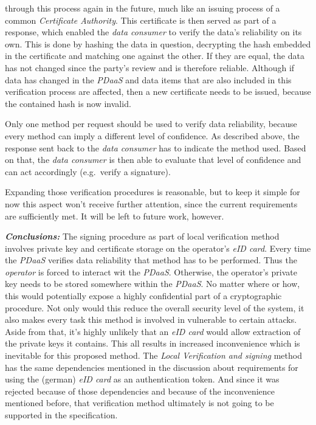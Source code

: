 \documentclass[12pt,english,a4paper,titlepage,cleardoublepage=empty,dottedtoc]{report}
\begin{document}
\begin{enumerate}
  through this process again in the future, much like an issuing process
  of a common \emph{Certificate Authority}. This certificate is then
  served as part of a response, which enabled the \emph{data consumer}
  to verify the data's reliability on its own. This is done by hashing
  the data in question, decrypting the hash embedded in the certificate
  and matching one against the other. If they are equal, the data has
  not changed since the party's review and is therefore reliable.
  Although if data has changed in the \emph{PDaaS} and data items that
  are also included in this verification process are affected, then a
  new certificate needs to be issued, because the contained hash is now
  invalid.
\end{enumerate}

Only one method per request should be used to verify data reliability,
because every method can imply a different level of confidence. As
described above, the response sent back to the \emph{data consumer} has
to indicate the method used. Based on that, the \emph{data consumer} is
then able to evaluate that level of confidence and can act accordingly
(e.g.~verify a signature).

Expanding those verification procedures is reasonable, but to keep it
simple for now this aspect won't receive further attention, since the
current requirements are sufficiently met. It will be left to future
work, however.

\emph{\textbf{Conclusions:}} The signing procedure as part of local
verification method involves private key and certificate storage on the
operator's \emph{eID card}. Every time the \emph{PDaaS} verifies data
reliability that method has to be performed. Thus the \emph{operator} is
forced to interact wit the \emph{PDaaS}. Otherwise, the operator's
private key needs to be stored somewhere within the \emph{PDaaS}. No
matter where or how, this would potentially expose a highly confidential
part of a cryptographic procedure. Not only would this reduce the
overall security level of the system, it also makes every task this
method is involved in vulnerable to certain attacks. Aside from that,
it's highly unlikely that an \emph{eID card} would allow extraction of
the private keys it contains. This all results in increased
inconvenience which is inevitable for this proposed method. The
\emph{Local Verification and signing} method has the same dependencies
mentioned in the discussion about requirements for using the (german)
\emph{eID card} as an authentication token. And since it was rejected
because of those dependencies and because of the inconvenience mentioned
before, that verification method ultimately is not going to be supported
in the specification.
\end{document}
